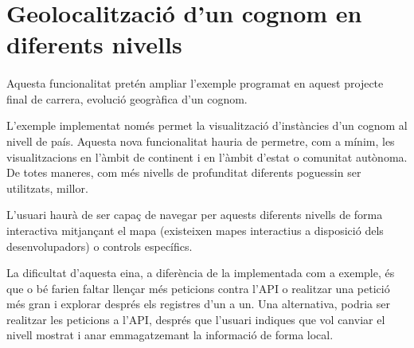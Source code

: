 \section{Geolocalització d'un cognom en diferents nivells}

    \paragraph{}
    Aquesta funcionalitat pretén ampliar l'exemple programat en aquest projecte final de carrera, evolució geogràfica d'un cognom.

    L'exemple implementat només permet la visualització d'instàncies d'un cognom al nivell de país. Aquesta nova funcionalitat hauria de permetre, com a mínim, les visualitzacions en l'àmbit de continent i en l'àmbit d'estat o comunitat autònoma. De totes maneres, com més nivells de profunditat diferents poguessin ser utilitzats, millor.

    L'usuari haurà de ser capaç de navegar per aquests diferents nivells de forma interactiva mitjançant el mapa (existeixen mapes interactius a disposició dels desenvolupadors) o controls específics.

    La dificultat d'aquesta eina, a diferència de la implementada com a exemple, és que o bé farien faltar llençar més peticions contra l'API o realitzar una petició més gran i explorar després els registres d'un a un. Una alternativa, podria ser realitzar les peticions a l'API, després que l'usuari indiques que vol canviar el nivell mostrat i anar emmagatzemant la informació de forma local.
